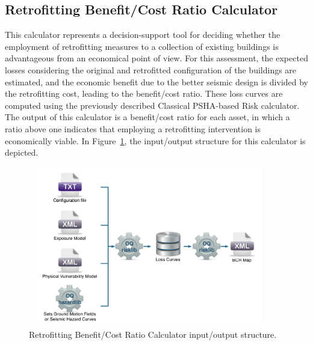 \subsection{Retrofitting Benefit/Cost Ratio Calculator}
This calculator represents a decision-support tool for deciding whether the employment of retrofitting measures to a collection of existing buildings is advantageous from an economical point of view. For this assessment, the expected losses considering the original and retrofitted configuration of the buildings are estimated, and the economic benefit due to the better seismic design is divided by the retrofitting cost, leading to the benefit/cost ratio. These loss curves are computed using the previously described  Classical PSHA-based Risk calculator. The output of this calculator is a benefit/cost ratio for each asset, in which a ratio above one indicates that employing  a retrofitting intervention is economically viable. In Figure~\ref{fig:BCR}, the input/output structure for this calculator is depicted.

\begin{figure}[ht]
\centering
\includegraphics[width=10.5cm,height=7cm]{figures/risk/BCR.pdf}
\caption{Retrofitting Benefit/Cost Ratio Calculator input/output structure.}
\label{fig:BCR}
\end{figure}